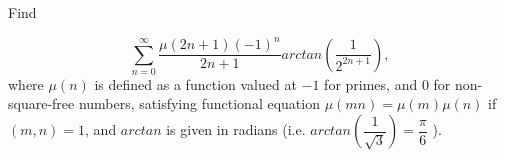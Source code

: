 Find

\[\sum_{n=0}^{\infty} \dfrac{\mu (2n + 1)(-1)^n}{2n + 1} arctan ( \dfrac{1}{2^{2n+1}}),\]where $\mu (n)$ is defined as a function valued at $-1$ for primes, and $0$ for non-square-free numbers, satisfying functional equation $\mu (mn) = \mu (m) \mu (n)$ if $(m, n) = 1$, and $arctan$ is given in radians (i.e. $arctan ( \dfrac{1}{\sqrt3})=\dfrac{\pi}{6}$ ).
